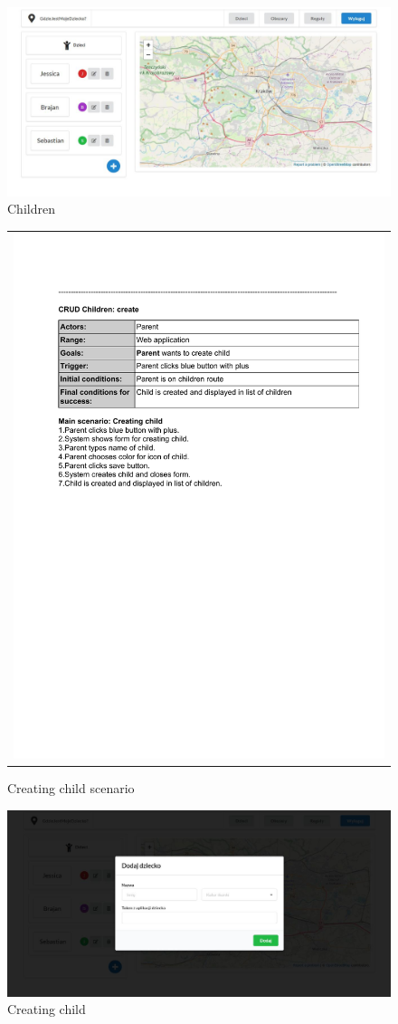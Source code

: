 \documentclass{sprawozdanie-agh}
\begin{document}
    	\begin{figure}[H]
    		\centering
    		\includegraphics[width=.80\textwidth]{children}
    		\caption{Children}
    	\end{figure}

    	\begin{figure}[H]
    		\centering
    		\begin{tabular}{c}
    			\includegraphics[width=.80\textwidth]{crC_cropped}
    		\end{tabular}
    		\caption{Creating child scenario}
    	\end{figure}

    	\begin{figure}[H]
    		\centering
    		\includegraphics[width=.80\textwidth]{addChild}
    		\caption{Creating child}
    	\end{figure}
\end{document}
